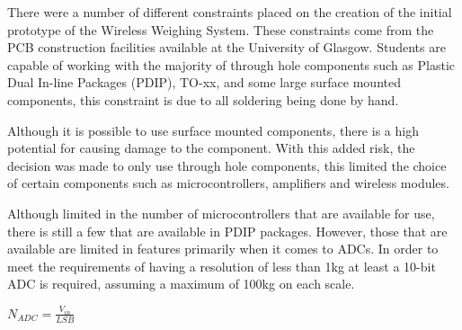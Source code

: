 There were a number of different constraints placed on the creation of the initial prototype of the Wireless Weighing System. These constraints come from the PCB construction facilities available at the University of Glasgow. Students are capable of working with the majority of through hole components such as Plastic Dual In-line Packages (PDIP), TO-xx, and some large surface mounted components, this constraint is due to all soldering being done by hand.

Although it is possible to use surface mounted components, there is a high potential for causing damage to the component. With this added risk, the decision was made to only use through hole components, this limited the choice of certain components such as microcontrollers, amplifiers and wireless modules.

Although limited in the number of microcontrollers that are available for use, there is still a few that are available in PDIP packages. However, those that are available are limited in features primarily when it comes to ADCs. In order to meet the requirements of having a resolution of less than 1kg at least a 10-bit ADC is required, assuming a maximum of 100kg on each scale.

\begin{center}
$N_{ADC} = \frac{V_{in}}{LSB}$ \cite[page 8]{edp2}
\end{center}
